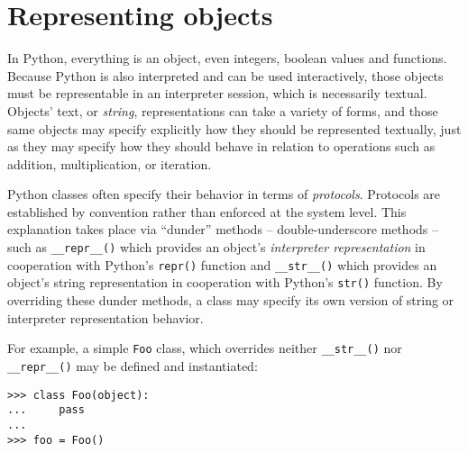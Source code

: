 \section{Representing objects}
\label{sec:representing-objects}

In Python, everything is an object, even integers, boolean values and
functions. Because Python is also interpreted and can be used interactively,
those objects must be representable in an interpreter session, which is
necessarily textual. Objects' text, or \emph{string}, representations can take
a variety of forms, and those same objects may specify explicitly how they
should be represented textually, just as they may specify how they should
behave in relation to operations such as addition, multiplication, or
iteration.

Python classes often specify their behavior in terms of \emph{protocols}.
Protocols are established by convention rather than enforced at the system
level. This explanation takes place via \enquote{dunder} methods --
double-underscore methods -- such as \texttt{\_\_repr\_\_()} which provides an
object's \emph{interpreter representation} in cooperation with Python's
\texttt{repr()} function and \texttt{\_\_str\_\_()} which provides an object's
string representation in cooperation with Python's \texttt{str()}
function. By overriding these dunder methods, a class may specify its own
version of string or interpreter representation behavior.

For example, a simple \texttt{Foo} class, which overrides neither
\texttt{\_\_str\_\_()} nor \texttt{\_\_repr\_\_()} may be defined and
instantiated:

\begin{comment}
<abjad>
class Foo(object):
    pass

foo = Foo()
</abjad>
\end{comment}

\begin{abjadbookoutput}
\begin{singlespacing}
\vspace{-0.5\baselineskip}
\begin{verbatim}
>>> class Foo(object):
...     pass
...
>>> foo = Foo()
\end{verbatim}
\end{singlespacing}
\end{abjadbookoutput}

